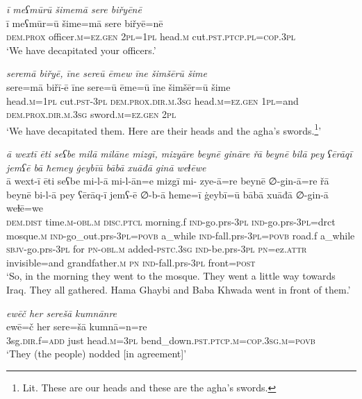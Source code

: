 \ea \label{BP.96}
\textit{ī meʕmūrū šimemā sere biřyēnē} \\ 
\gll ī meʕmūr=ū šime=mā sere biřyē=nē \\ 
 \textsc{dem.prox} officer\textsc{.m}\textsc{=ez.gen} \textsc{2pl}\textsc{=\textsc{1pl}} head\textsc{.m} cut\textsc{.pst}\textsc{.ptcp}\textsc{.pl}\textsc{=cop}\textsc{.3pl} \\ 
\glt `We have decapitated your officers.'
\z 
 
\ea \label{BP.97}
\textit{seremā biřyē, īne sereū ēmew īne šimšērū šime} \\ 
\gll sere=mā biřī-ē īne sere=ū ēme=ū īne šimšēr=ū šime \\ 
 head\textsc{.m}\textsc{=\textsc{1pl}} cut\textsc{.pst}\textsc{-3pl} \textsc{dem.prox}\textsc{.dir}\textsc{.m}\textsc{.3sg} head\textsc{.m}\textsc{=ez.gen} \textsc{1pl}=and \textsc{dem.prox}\textsc{.dir}\textsc{.m}\textsc{.3sg} sword\textsc{.m}\textsc{=ez.gen} \textsc{2pl} \\ 
\glt `We have decapitated them. Here are their heads and the agha’s swords.\footnote{Lit. These are our heads and these are the agha’s swords.}'
\z 
 
\ea \label{BP.98}
\textit{ā wextī ēti seʕbe milā milāne mizgī, mizyāre beynē gināre řā beynē bilā pey ʕērāqī jemʕē bā ħemey ġeybīū bābā xuāđā ginā weɫēwe} \\ 
\gll ā wext-ī ēti seʕbe mi-l-ā mi-l-ān=e mizgī mi- zye-ā=re beynē ∅-gin-ā=re řā beynē bi-l-ā pey ʕērāq-ī jemʕ-ē ∅-b-ā ħeme=ī ġeybī=ū bābā xuāđā ∅-gin-ā weɫē=we \\ 
 \textsc{dem.dist} time\textsc{.m}\textsc{-obl}\textsc{.m} \textsc{disc.ptcl} morning.f \textsc{ind-}go.prs\textsc{-3pl} \textsc{ind-}go.prs\textsc{-3pl}=drct mosque\textsc{.m} \textsc{ind-}go\_out.prs\textsc{-3pl}\textsc{=\textsc{povb}} a\_while \textsc{ind-}fall.prs\textsc{-3pl}\textsc{=\textsc{povb}} road.f a\_while \textsc{sbjv-}go.prs\textsc{-3pl} for \textsc{pn}\textsc{-obl}\textsc{.m} added\textsc{-pstc}\textsc{.3sg} \textsc{ind-}be.prs\textsc{-3pl} \textsc{pn}=ez.\textsc{attr} invisible=and grandfather\textsc{.m} \textsc{pn} \textsc{ind-}fall.prs\textsc{-3pl} front\textsc{=\textsc{post}} \\ 
\glt `So, in the morning they went to the mosque. They went a little way towards Iraq. They all gathered. Hama Ghaybi and Baba Khwada went in front of them.'
\z 
 
\ea \label{BP.104}
\textit{ewēč her serešā kumnānre} \\ 
\gll ewē=č her sere=šā kumnā=n=re \\ 
 3sg\textsc{.dir}.f\textsc{=add} just head\textsc{.m}\textsc{=3pl} bend\_down\textsc{.pst}\textsc{.ptcp}\textsc{.m}\textsc{=cop}\textsc{.3sg}\textsc{.m}\textsc{=\textsc{povb}} \\ 
\glt `They (the people) nodded [in agreement]'
\z 
 
